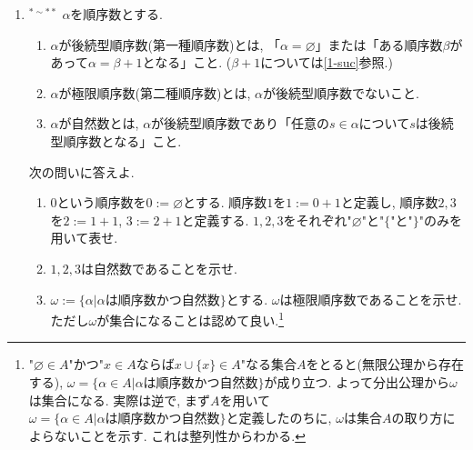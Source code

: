 \documentclass[dvipdfmx,a4paper,11pt]{article}
\theoremstyle{definition}
\begin{document}
\begin{enumerate}[label=\textbf{問}\ref*{sec-1}.\arabic*]
\item \label{1-natural} $^{* \sim **}$ $\alpha$を順序数とする. 
\begin{enumerate}[label=(\alph*).]
 \setlength{\parskip}{0cm}
  \setlength{\itemsep}{0pt}
\item $\alpha$が後続型順序数(第一種順序数)とは, 「$\alpha=\varnothing$」または「ある順序数$\beta$があって$\alpha=\beta+1$となる」こと. ($\beta+1$については\ref{1-suc}参照.)
\item $\alpha$が極限順序数(第二種順序数)とは, $\alpha$が後続型順序数でないこと. 
\item $\alpha$が自然数とは, $\alpha$が後続型順序数であり「任意の$s \in \alpha$について$s$は後続型順序数となる」こと.
  \end{enumerate}
次の問いに答えよ.
   \begin{enumerate}[label=(\arabic*).]
 \setlength{\parskip}{0cm}
  \setlength{\itemsep}{0pt}
  \item $0$という順序数を$0:=\varnothing$とする. 
  順序数$1$を$1:=0+1$と定義し, 順序数$2,3$を$2:=1+1$, $3 := 2+1$と定義する. 
  $1,2,3$をそれぞれ"$\varnothing$"と"$\{$"と"$\}$"のみを用いて表せ.
  \item $1,2,3$は自然数であることを示せ.
  \item $\omega:= \{ \alpha | \text{$\alpha$は順序数かつ自然数}\}$とする. $\omega$は極限順序数であることを示せ. ただし$\omega$が集合になることは認めて良い.\footnote{"$\varnothing \in A$"かつ"$x \in A$ならば$x \cup \{ x\} \in A$"なる集合$A$をとると(無限公理から存在する), $\omega=\{ \alpha \in A| \text{$\alpha$は順序数かつ自然数}\}$が成り立つ. よって分出公理から$\omega$は集合になる. 実際は逆で, まず$A$を用いて$\omega=\{ \alpha \in A| \text{$\alpha$は順序数かつ自然数}\}$と定義したのちに, $\omega$は集合$A$の取り方によらないことを示す. これは整列性からわかる. }
   
  \end{enumerate}
 


\end{enumerate}
\end{document}
